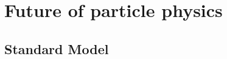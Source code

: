 \documentclass{beamer}
\begin{document}
  \section{Future of particle physics}
    \subsection{Standard Model}



\end{document}
